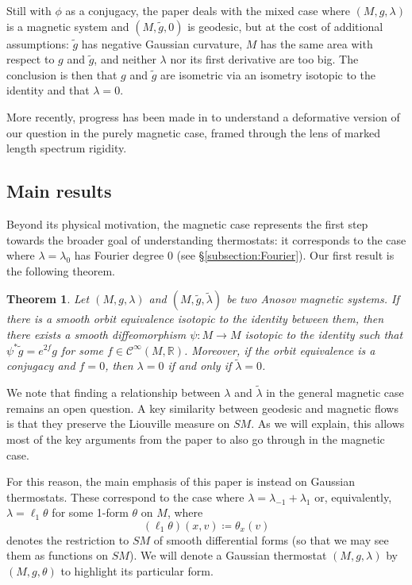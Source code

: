 \documentclass[reqno,12pt,letterpaper]{amsart}
\newtheorem{theorem}[proposition]{Theorem}
\theoremstyle{definition}
\theoremstyle{remark}
\theoremstyle{definition}
\numberwithin{equation}{section}
\newcommand{\R}{\mathbb{R}}
\begin{document}
Still with $\phi$ as a conjugacy, the paper \cite{grognet99} deals with the mixed case where $(M, g, \lambda)$ is a magnetic system and $(M, \tilde{g}, 0)$ is geodesic, but at the cost of additional assumptions: $\tilde{g}$ has negative Gaussian curvature, $M$ has the same area with respect to $g$ and $\tilde{g}$, and neither $\lambda$ nor its first derivative are too big. The conclusion is then that $g$ and $\tilde{g}$ are isometric via an isometry isotopic to the identity and that $\lambda=0$. 

More recently, progress has been made in \cite{marshall-reber23, marshall-reber24} to understand a deformative version of our question in the purely magnetic case, framed through the lens of marked length spectrum rigidity. 

\subsection{Main results} Beyond its physical motivation, the magnetic case represents the first step towards the broader goal of understanding thermostats: it corresponds to the case where $\lambda=\lambda_0$ has Fourier degree $0$ (see \S\ref{subsection:Fourier}). Our first result is the following theorem.

\begin{theorem}\label{theorem:second-theorem}
Let $(M, g, \lambda)$ and $(M, \tilde{g}, \tilde{\lambda})$ be two Anosov magnetic systems. If there is a smooth orbit equivalence isotopic to the identity between them, then there exists a smooth diffeomorphism $\psi : M\to M$ isotopic to the identity such that $\psi^*\tilde{g}=e^{2f}g$ for some $f\in \mathcal{C}^\infty(M, \R)$. Moreover, if the orbit equivalence is a conjugacy and $f=0$, then  $\lambda=0$ if and only if $\tilde{\lambda}=0$. 
\end{theorem}

We note that finding a relationship between $\lambda$ and $\tilde{\lambda}$ in the general magnetic case remains an open question. A key similarity between geodesic and magnetic flows is that they preserve the Liouville measure on $SM$. As we will explain, this allows most of the key arguments from the paper  \cite{guillarmou25} to also go through in the magnetic case.

For this reason, the main emphasis of this paper is instead on Gaussian thermostats. These correspond to the case where $\lambda=\lambda_{-1}+\lambda_1$ or, equivalently, $\lambda=\ell_1\theta$ for some 1-form $\theta$ on $M$, where
\begin{equation}\label{eq:defn-ell_1}
(\ell_1\theta)(x,v)\coloneqq\theta_x(v)
\end{equation}
denotes the restriction to $SM$ of smooth differential forms (so that we may see them as functions on $SM$). We will denote a Gaussian thermostat $(M, g, \lambda)$ by $(M, g, \theta)$ to highlight its particular form. 
\end{document}
